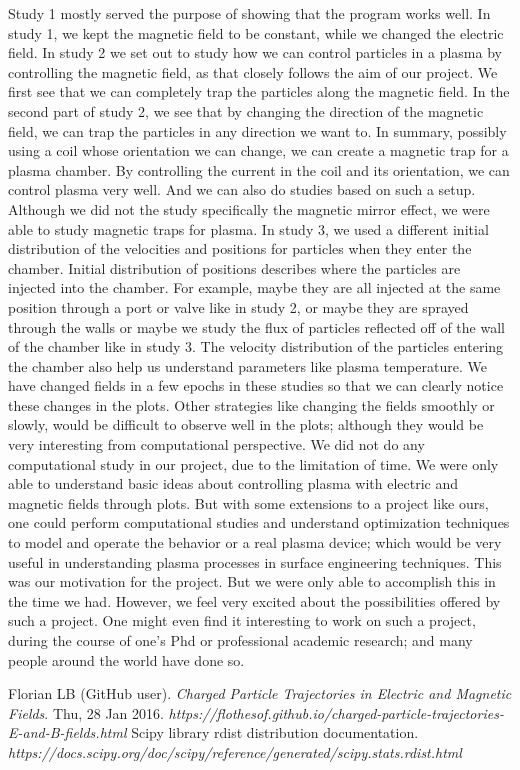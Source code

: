 \documentclass[12pt]{article}
\begin{document}
	\noindent Study 1 mostly served the purpose of showing that the program works well. In study 1, we kept the magnetic field to be constant, while we changed the electric field. In study 2 we set out to study how we can control particles in a plasma by controlling the magnetic field, as that closely follows the aim of our project. We first see that we can completely trap the particles along the magnetic field. In the second part of study 2, we see that by changing the direction of the magnetic field, we can trap the particles in any direction we want to. In summary, possibly using a coil whose orientation we can change, we can create a magnetic trap for a plasma chamber. By controlling the current in the coil and its orientation, we can control plasma very well. And we can also do studies based on such a setup. Although we did not the study specifically the magnetic mirror effect, we were able to study magnetic traps for plasma. In study 3, we used a different initial distribution of the velocities and positions for particles when they enter the chamber. Initial distribution of positions describes where the particles are injected into the chamber. For example, maybe they are all injected at the same position through a port or valve like in study 2, or maybe they are sprayed through the walls or maybe we study the flux of particles reflected off of the wall of the chamber like in study 3. The velocity distribution of the particles entering the chamber also help us understand parameters like plasma temperature. We have changed fields in a few epochs in these studies so that we can clearly notice these changes in the plots. Other strategies like changing the fields smoothly or slowly, would be difficult to observe well in the plots; although they would be very interesting from computational perspective. We did not do any computational study in our project, due to the limitation of time. We were only able to understand basic ideas about controlling plasma with electric and magnetic fields through plots. But with some extensions to a project like ours, one could perform computational studies and understand optimization techniques to model and operate the behavior or a real plasma device; which would be very useful in understanding plasma processes in surface engineering techniques. This was our motivation for the project. But we were only able to accomplish this in the time we had. However, we feel very excited about the possibilities offered by such a project. One might even find it interesting to work on such a project, during the course of one's Phd or professional academic research; and many people around the world have done so.

\begin{thebibliography}{}
	 Florian LB (GitHub user). \textit{Charged Particle Trajectories in Electric and Magnetic Fields}. Thu, 28 Jan 2016. \textit{https://flothesof.github.io/charged-particle-trajectories-E-and-B-fields.html}
	 Scipy library rdist distribution documentation. \textit{https://docs.scipy.org/doc/scipy/reference/generated/scipy.stats.rdist.html}
\end{thebibliography}
\end{document}
